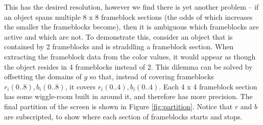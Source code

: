 \documentclass[conference]{IEEEtran}
\begin{document}
This has the desired resolution,
however we find there is yet another problem --
if an object spans multiple 8 x 8 frameblock sections
(the odds of which increases the smaller the frameblocks become),
then it is ambiguous which frameblocks are active and which are not.
To demonstrate this, consider an object that is contained by 2 frameblocks
and is straddling a frameblock section.
When extracting the frameblock data from the color values,
it would appear as though the object resides in 4 frameblocks instead of 2.
%
%
This dilemma can be solved by offsetting the domains of $g$ so that,
instead of covering frameblocks
$r_i(0..8),b_i(0..8)$,
it covers $r_i(0..4),b_i(0..4)$.
Each 4 x 4 frameblock section has some wiggle-room built in around it,
and therefore has more precision.
The final partition of the screen is shown in Figure \ref{fig:partition}.
Notice that $r$ and $b$ are subscripted, to show where each
section of frameblocks starts and stops.
\end{document}
